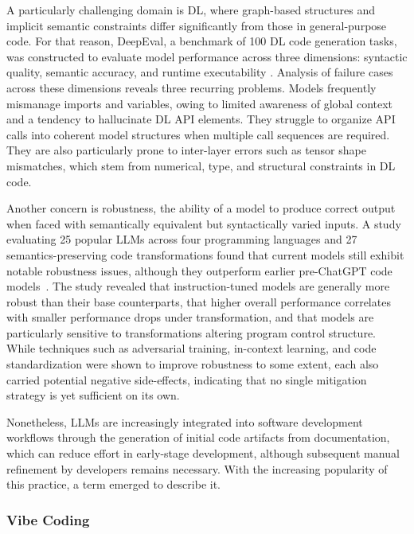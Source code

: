 \documentclass[
english,                 %
bibtex,                  %
]{kththesis}
\numberwithin{listing}{chapter}
\begin{document}
A particularly challenging domain is \gls{DL}, where graph-based structures and implicit semantic constraints differ significantly from those in general-purpose code. For that reason, \gls{DeepEval}, a benchmark of 100 \gls{DL} code generation tasks, was constructed to evaluate model performance across three dimensions: syntactic quality, semantic accuracy, and runtime executability \cite{ma_how_2026}. Analysis of failure cases across these dimensions reveals three recurring problems. Models frequently mismanage imports and variables, owing to limited awareness of global context and a tendency to hallucinate \gls{DL} \gls{API} elements. They struggle to organize \gls{API} calls into coherent model structures when multiple call sequences are required. They are also particularly prone to inter-layer errors such as tensor shape mismatches, which stem from numerical, type, and structural constraints in \gls{DL} code.

Another concern is robustness, the ability of a model to produce correct output when faced with semantically equivalent but syntactically varied inputs. A study evaluating 25 popular \glspl{LLM} across four programming languages and 27 semantics-preserving code transformations found that current models still exhibit notable robustness issues, although they outperform earlier pre-Chat\gls{GPT} code models~\cite{liu_robustness_2026}. The study revealed that instruction-tuned models are generally more robust than their base counterparts, that higher overall performance correlates with smaller performance drops under transformation, and that models are particularly sensitive to transformations altering program control structure. While techniques such as adversarial training, in-context learning, and code standardization were shown to improve robustness to some extent, each also carried potential negative side-effects, indicating that no single mitigation strategy is yet sufficient on its own.

Nonetheless, \glspl{LLM} are increasingly integrated into software development workflows through the generation of initial code artifacts from documentation, which can reduce effort in early-stage development, although subsequent manual refinement by developers remains necessary. With the increasing popularity of this practice, a term emerged to describe it.

\subsubsection{Vibe Coding}
\label{sec:bg_vibe_coding}
\end{document}

